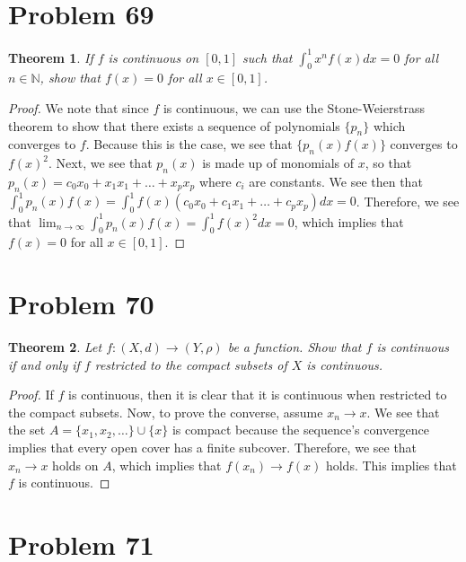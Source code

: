 \documentclass[psamsfonts]{amsart}
\newtheorem{thm}{Theorem}[section]
\theoremstyle{definition}
\theoremstyle{remark}
\numberwithin{equation}{section}
\begin{document}
\section{Problem 69}

\begin{thm}
If $f$ is continuous on $[0,1]$ such that $\int_0^1 x^n f(x) dx = 0$ for all $n \in \mathbb{N}$, show that $f(x) = 0$ for all $x \in [0,1]$. 
\end{thm}

\begin{proof}
We note that since $f$ is continuous, we can use the Stone-Weierstrass theorem to show that there exists a sequence of polynomials $\{ p_n \}$ which converges to $f$. Because this is the case, we see that $\{ p_n(x) f(x) \}$ converges to $f(x)^2$. Next, we see that $p_n(x)$ is made up of monomials of $x$, so that $p_n(x) = c_0 x_0 + x_1 x_1 + \ldots + x_p x_p$ where $c_i$ are constants. We see then that $\int_0^1 p_n(x) f(x) = \int_0^1 f(x) (c_0 x_0 + c_1 x_1 + \ldots + c_p x_p) dx = 0$. Therefore, we see that $\lim_{n \to \infty} \int_0^1 p_n(x) f(x) = \int_0^1 f(x)^2 dx = 0$, which implies that $f(x) = 0$ for all $x \in [0,1]$.
\end{proof}

\section{Problem 70}

\begin{thm}
Let $f:(X,d) \to (Y, \rho)$ be a function. Show that $f$ is continuous if and only if $f$ restricted to the compact subsets of $X$ is continuous.
\end{thm}

\begin{proof}
If $f$ is continuous, then it is clear that it is continuous when restricted to the compact subsets. Now, to prove the converse, assume $x_n \to x$. We see that the set $A = \{x_1, x_2, \ldots \} \cup \{x \}$ is compact because the sequence's convergence implies that every open cover has a finite subcover. Therefore, we see that $x_n \to x$ holds on $A$, which implies that $f(x_n) \to f(x)$ holds. This implies that $f$ is continuous.
\end{proof}

\section{Problem 71}
\end{document}
